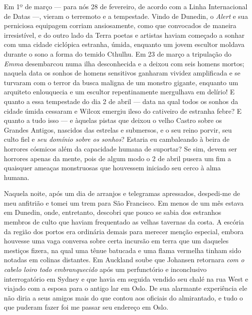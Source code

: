 Em 1º de março --- para nós 28 de fevereiro, de
acordo com a Linha Internacional de Datas ---, vieram o terremoto 
e a tempestade. Vindo de Dunedin, o \emph{Alert} e sua perniciosa equipagem
corriam ansiosamente, como que convocados de maneira irresistível, e do
outro lado da Terra poetas e artistas haviam começado a sonhar com uma
cidade ciclópica estranha, úmida, enquanto um jovem escultor moldava
durante o sono a forma do temido Cthulhu. Em 23 de março a tripulação do
\emph{Emma} desembarcou numa ilha desconhecida e a deixou com seis
homens mortos; naquela data os sonhos de homens sensitivos ganharam
vividez amplificada e se turvaram com o terror da busca maligna de um
monstro gigante, enquanto um arquiteto enlouquecia e um escultor
repentinamente mergulhava em delírio! E quanto a essa tempestade do dia
2 de abril --- data na qual todos os sonhos da cidade úmida cessaram e
Wilcox emergiu ileso do cativeiro de estranha febre? E quanto a tudo
isso --- e àquelas pistas que deixou o velho Castro sobre os Grandes
Antigos, nascidos das estrelas e submersos, e o seu reino porvir, seu
culto fiel e \emph{seu domínio sobre os sonhos}? Estaria eu cambaleando
à beira de horrores cósmicos além da capacidade humana de suportar? Se
sim, devem ser horrores apenas da mente, pois de algum modo o 2 de
abril pusera um fim a quaisquer ameaças monstruosas que houvessem
iniciado seu cerco à alma humana.

Naquela noite, após um dia de arranjos e telegramas apressados,
despedi-me de meu anfitrião e tomei um trem para São Francisco. Em menos
de um mês estava em Dunedin, onde, entretanto, descobri que pouco se
sabia dos estranhos membros de culto que haviam frequentado as velhas
tavernas da costa. A escória da região dos portos era ordinária demais
para merecer menção especial, embora houvesse uma vaga conversa sobre
certa incursão em terra que um daqueles mestiços fizera, na qual uma
tênue batucada e uma flama vermelha tinham sido notadas em colinas
distantes. Em Auckland soube que Johansen retornara \emph{com o cabelo
loiro todo embranquecido} após um perfunctório e inconclusivo
interrogatório em Sydney e que havia em seguida vendido seu chalé na rua West 
e viajado com a esposa para o antigo lar em Oslo. De sua
alarmante experiência ele não diria a seus amigos mais do que contou aos
oficiais do almirantado, e tudo o que puderam fazer foi me passar seu
endereço em Oslo.

